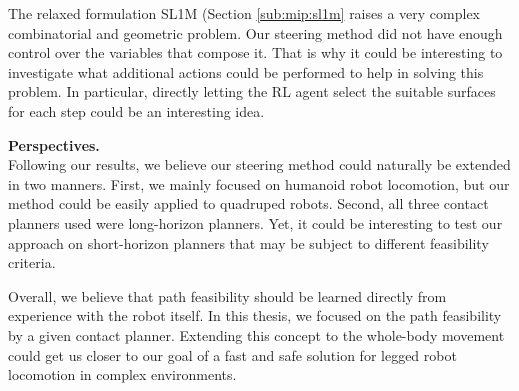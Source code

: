 The relaxed formulation SL1M (Section \ref{sub:mip:sl1m} raises a very complex combinatorial and geometric problem.
Our steering method did not have enough control over the variables that compose it. That is why it could be interesting to investigate what additional actions could be performed to help in solving this problem. In particular, directly letting the RL agent select the suitable surfaces for each step could be an interesting idea.



\hfill \break

\noindent\textbf{Perspectives.}\\

Following our results, we believe our steering method could naturally be extended in two manners.
First, we mainly focused on humanoid robot locomotion, but our method could be easily applied to quadruped robots.
Second, all three contact planners used were long-horizon planners. Yet, it could be interesting to test our approach on short-horizon planners that may be subject to different feasibility criteria.


Overall, we believe that path feasibility should be learned directly from experience with the robot itself.
In this thesis, we focused on the path feasibility by a given contact planner. Extending this concept to the whole-body movement could get us closer to our goal of a fast and safe solution for legged robot locomotion in complex environments.

